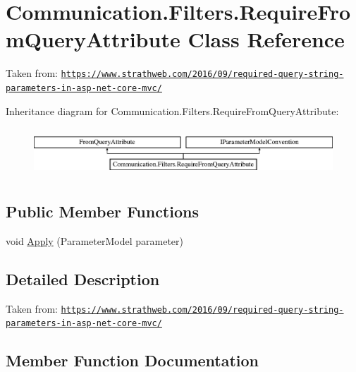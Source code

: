 \hypertarget{class_communication_1_1_filters_1_1_require_from_query_attribute}{}\section{Communication.\+Filters.\+Require\+From\+Query\+Attribute Class Reference}
\label{class_communication_1_1_filters_1_1_require_from_query_attribute}


Taken from\+: \href{https://www.strathweb.com/2016/09/required-query-string-parameters-in-asp-net-core-mvc/}{\tt https\+://www.\+strathweb.\+com/2016/09/required-\/query-\/string-\/parameters-\/in-\/asp-\/net-\/core-\/mvc/}  


Inheritance diagram for Communication.\+Filters.\+Require\+From\+Query\+Attribute\+:\begin{figure}[H]
\begin{center}
\leavevmode
\includegraphics[height=1.848185cm]{class_communication_1_1_filters_1_1_require_from_query_attribute}
\end{center}
\end{figure}
\subsection*{Public Member Functions}
\begin{DoxyCompactItemize}
\item 
void \mbox{\hyperlink{class_communication_1_1_filters_1_1_require_from_query_attribute_aa627be8fe80705612e7c06b24ad34a59}{Apply}} (Parameter\+Model parameter)
\end{DoxyCompactItemize}


\subsection{Detailed Description}
Taken from\+: \href{https://www.strathweb.com/2016/09/required-query-string-parameters-in-asp-net-core-mvc/}{\tt https\+://www.\+strathweb.\+com/2016/09/required-\/query-\/string-\/parameters-\/in-\/asp-\/net-\/core-\/mvc/} 



\subsection{Member Function Documentation}
\mbox{\label{class_communication_1_1_filters_1_1_require_from_query_attribute_aa627be8fe80705612e7c06b24ad34a59}} 
